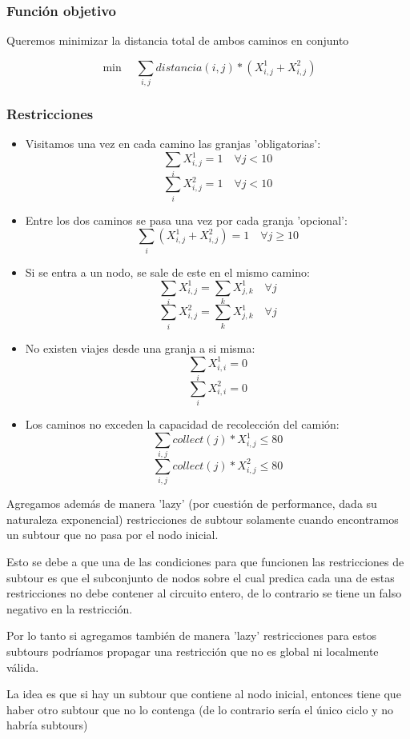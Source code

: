 \subsubsection{Función objetivo}
Queremos minimizar la distancia total de ambos caminos en conjunto

$$\min \quad \sum_{i,j} distancia(i,j)*(X^1_{i,j} + X^2_{i,j}) $$
\subsubsection{Restricciones}

\begin{itemize}
    \item Visitamos una vez en cada camino las granjas 'obligatorias':
    $$ \sum_{i} X^1_{i,j} = 1 \quad \forall j < 10 $$
    $$ \sum_{i} X^2_{i,j} = 1 \quad \forall j < 10 $$

    \item Entre los dos caminos se pasa una vez por cada granja 'opcional':
    $$ \sum_{i} (X^1_{i,j} + X^2_{i,j}) = 1 \quad \forall j \geq 10 $$

    \item Si se entra a un nodo, se sale de este en el mismo camino:
    $$ \sum_{i} X^1_{i,j} = \sum_{k} X^1_{j,k}  \quad \forall j $$
    $$ \sum_{i} X^2_{i,j} = \sum_{k} X^1_{j,k}  \quad \forall j $$

    \item No existen viajes desde una granja a si misma:
    $$ \sum_{i} X^1_{i,i} = 0 $$
    $$ \sum_{i} X^2_{i,i} = 0 $$

    \item Los caminos no exceden la capacidad de recolección del camión:
    $$ \sum_{i,j} collect(j)*X^1_{i,j} \leq 80 $$
    $$ \sum_{i,j} collect(j)*X^2_{i,j} \leq 80 $$

\end{itemize}

Agregamos además de manera 'lazy' (por cuestión de performance, dada su naturaleza exponencial) restricciones de subtour solamente cuando encontramos un subtour que no pasa por el nodo inicial.

Esto se debe a que una de las condiciones para que funcionen las restricciones de subtour es que el subconjunto de nodos sobre el cual predica cada una de estas restricciones no debe contener al circuito entero, de lo contrario se tiene un falso negativo en la restricción.

Por lo tanto si agregamos también de manera 'lazy' restricciones para estos subtours podríamos propagar una restricción que no es global ni localmente válida.

La idea es que si hay un subtour que contiene al nodo inicial, entonces tiene que haber otro subtour que no lo contenga (de lo contrario sería el único ciclo y no habría subtours)
